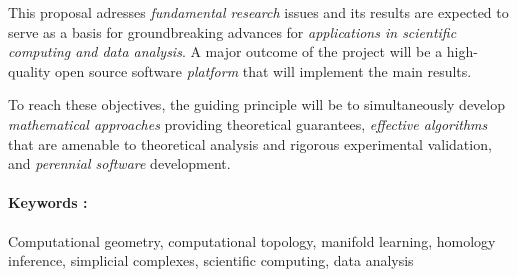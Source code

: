 \documentclass[a4paper, 11pt]{article}
\begin{document}
This proposal adresses {\em fundamental
  research} issues and its results are expected to serve as a basis
for groundbreaking advances for {\em applications in scientific computing
and data analysis}.  A major outcome of the project will be a
high-quality open source software {\em platform} 
that will implement the main results.

To reach these objectives, the guiding principle  will be to simultaneously
develop {\em mathematical approaches} providing theoretical
guarantees, {\em effective algorithms} that are amenable to
theoretical analysis and rigorous experimental validation, and {\em
  perennial software} development. 




\paragraph{Keywords :} Computational geometry, computational topology,
manifold learning, homology inference, simplicial complexes,
scientific computing, data analysis
\newpage




\end{document}
